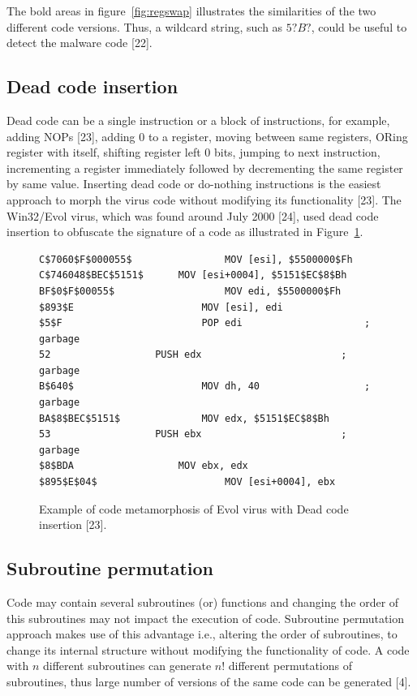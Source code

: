 The bold areas in figure~\ref{fig:regswap} illustrates the similarities of the two different code versions. Thus, a wildcard string, such as $5? B?$, could be useful to detect the malware code [22]. 

\subsection{Dead code insertion} 

Dead code can be a single instruction or a block of instructions, for example, adding NOPs [23], adding 0 to a register, moving between same registers, ORing register with itself, shifting register left 0 bits, jumping to next instruction, incrementing a register immediately followed by decrementing the same register by same value. Inserting dead code or do-nothing instructions is the easiest approach to morph the virus code without modifying its functionality [23]. 
The Win32/Evol virus, which was found around July 2000 [24], used dead code insertion to obfuscate the signature of a code as illustrated in Figure~\ref{fig:deadcode}. 

\begin{figure}
  \centering
  \begin{lstlisting}[language=myasm]
C$7060$F$000055$				MOV [esi], $5500000$Fh
C$746048$BEC$5151$		MOV [esi+0004], $5151$EC$8$Bh
BF$0$F$00055$					MOV edi, $5500000$Fh
$893$E 						MOV [esi], edi
$5$F 						POP edi						; garbage
52 					PUSH edx						; garbage
B$640$ 						MOV dh, 40 					; garbage
BA$8$BEC$5151$ 				MOV edx, $5151$EC$8$Bh
53 					PUSH ebx						; garbage
$8$BDA					MOV ebx, edx
$895$E$04$						MOV [esi+0004], ebx  
\end{lstlisting}
    \caption[Example of code metamorphosis of Evol virus ]{Example of code metamorphosis of Evol virus with Dead code insertion [23].}
    \label{fig:deadcode}
\end{figure}

\subsection{Subroutine permutation} 

Code may contain several subroutines (or) functions and changing the order of this subroutines may not impact the execution of code. Subroutine permutation approach makes use of this advantage i.e., altering the order of subroutines, to change its internal structure without modifying the functionality of code. A code with $n$ different subroutines can generate $n!$ different permutations of subroutines, thus large number of versions of the same code can be generated [4].


